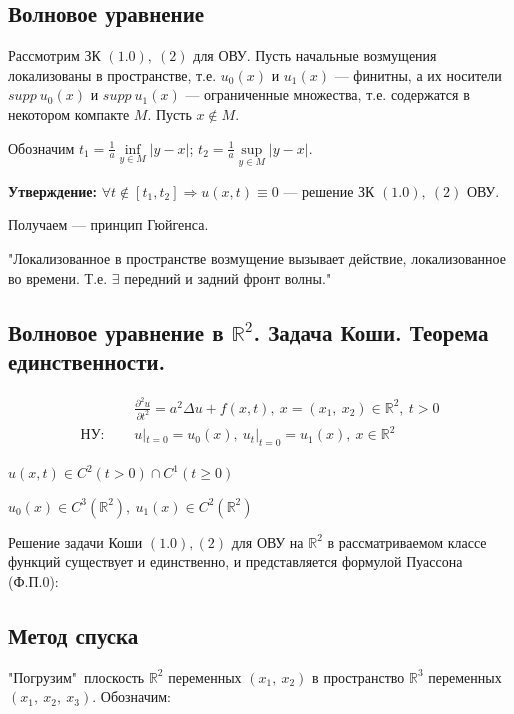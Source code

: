 \subsection{Волновое уравнение}

Рассмотрим ЗК $(1.0),\ (2)$ для ОВУ. Пусть начальные возмущения локализованы в пространстве, т.е. $u_0(x)$ и $u_1(x)$ --- финитны, а их носители $supp\ u_0(x)$ и $supp\ u_1(x)$ --- ограниченные множества, т.е. содержатся в некотором компакте $M$. Пусть $x \notin M$.

Обозначим $t_1 = \frac{1}{a} \inf\limits_{y \in M} |y - x|$; $t_2 = \frac{1}{a} \sup\limits_{y \in M} |y - x|$.

\textbf{Утверждение:} $\forall t \notin [t_1, t_2] \Rightarrow u(x, t) \equiv 0$ --- решение ЗК $(1.0),\ (2)$ ОВУ.

Получаем --- принцип Гюйгенса.

"Локализованное в пространстве возмущение вызывает действие, локализованное во времени. Т.е. $\exists$ передний и задний фронт волны."

\subsection{Волновое уравнение в $\mathbb{R}^2$. Задача Коши. Теорема единственности.}

\begin{align*}
	                    & \frac{\partial^2 u}{\partial t^2} = a^2 \Delta u + f(x, t),\ x = (x_1,\ x_2) \in \mathbb{R}^2,\ t > 0 \tag{1.f} \\
	\textbf{НУ: } \quad & u|_{t=0}=u_0(x),\ u_t|_{t=0}=u_1(x),\ x  \in \mathbb{R}^2 \tag{2}
\end{align*}

$u(x, t) \in C^2(t>0) \cap C^1(t \ge 0)$

$u_0(x) \in C^3(\mathbb{R}^2),\ u_1(x) \in C^2(\mathbb{R}^2)$

\begin{theorem}
	Решение задачи Коши $(1.0), (2)$ для ОВУ на $\mathbb{R}^2$ в рассматриваемом классе функций существует и единственно, и представляется формулой Пуассона (Ф.П.0):
\end{theorem}

\subsection{Метод спуска}
"Погрузим"\  плоскость $\mathbb{R}^2$ переменных $(x_1,\ x_2)$ в пространство $\mathbb{R}^3$ переменных $(x_1,\ x_2,\ x_3)$. Обозначим:

